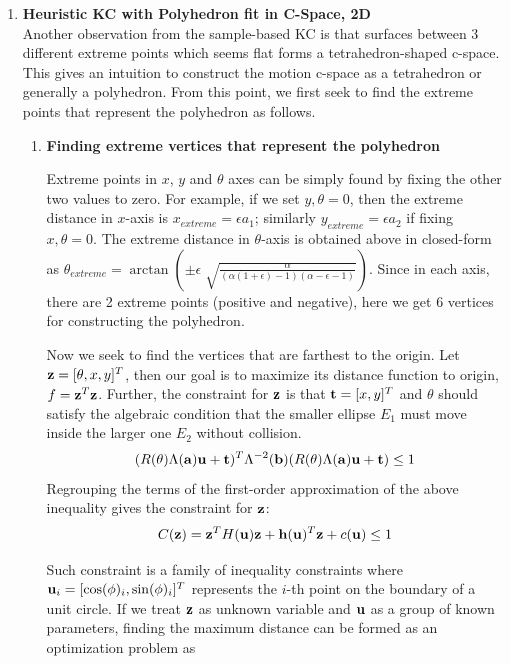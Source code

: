 \documentclass{article}
\begin{document}
\begin{enumerate}
\newpage
\item {\bf Heuristic KC with Polyhedron fit in C-Space, 2D}\\
Another observation from the sample-based KC is that surfaces between 3 different extreme points which seems flat forms a tetrahedron-shaped c-space. This gives an intuition to construct the motion c-space as a tetrahedron or generally a polyhedron. From this point, we first seek to find the extreme points that represent the polyhedron as follows.

\begin{enumerate}
\item {\bf Finding extreme vertices that represent the polyhedron}

Extreme points in $x$, $y$ and $\theta$ axes can be simply found by fixing the other two values to zero. For example, if we set $y,\theta = 0$, then the extreme distance in $x$-axis is $x_{extreme}=\epsilon a_1$; similarly $y_{extreme} = \epsilon a_2$ if fixing $x,\theta = 0$. The extreme distance in $\theta$-axis is obtained above in closed-form as $\theta_{extreme} = \arctan (\pm \epsilon \sqrt[]{\frac{\alpha}{(\alpha(1+\epsilon)-1)(\alpha - \epsilon - 1)}})$. Since in each axis, there are 2 extreme points (positive and negative), here we get 6 vertices for constructing the polyhedron.

Now we seek to find the vertices that are farthest to the origin. Let ${\bf z}=[\theta,x,y]^T$, then our goal is to maximize its distance function to origin, $f = {\bf z}^T {\bf z}$. Further, the constraint for ${\bf z}$ is that ${\bf t} = [x, y]^T$ and $\theta$ should satisfy the algebraic condition that the smaller ellipse $E_1$ must move inside the larger one $E_2$ without collision.
\begin{equation}
(R(\theta) \Lambda({\bf a}) {\bf u} + {\bf t})^T \Lambda^{-2}({\bf b}) (R(\theta) \Lambda({\bf a}) {\bf u} + {\bf t}) \leq 1
\end{equation}
Regrouping the terms of the first-order approximation of the above inequality gives the constraint for ${\bf z}$:
\begin{equation}
C({\bf z}) = {\bf z}^T H({\bf u}) {\bf z} + {\bf h}({\bf u})^T {\bf z} + c({\bf u}) \leq 1
\end{equation}

Such constraint is a family of inequality constraints where ${\bf u}_i = [\cos(\phi)_i, \sin(\phi)_i]^T$ represents the $i$-th point on the boundary of a unit circle. If we treat ${\bf z}$ as unknown variable and ${\bf u}$ as a group of known parameters, finding the maximum distance can be formed as an optimization problem as


\end{enumerate}
\end{enumerate}
\end{document}
